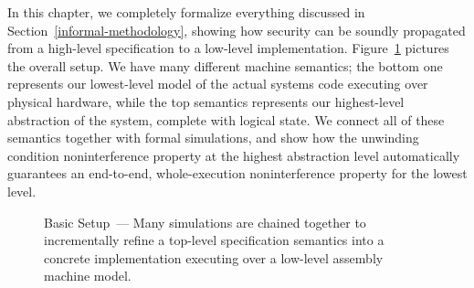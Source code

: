 \label{methodology-chapter}

In this chapter, we completely formalize everything
discussed in Section~\ref{informal-methodology}, showing
how security can be soundly propagated from a high-level 
specification to a low-level implementation. Figure~\ref{simulations}
pictures the overall setup. We have many different machine
semantics; the bottom one represents our lowest-level model of 
the actual systems code executing over physical hardware,
while the top semantics represents our highest-level abstraction
of the system, complete with logical state. We connect all
of these semantics together with formal simulations, and
show how the unwinding condition noninterference property
at the highest abstraction level automatically guarantees
an end-to-end, whole-execution noninterference property for
the lowest level.

\begin{figure}
\caption{\small{Basic Setup~--- Many simulations are chained together to 
incrementally refine a top-level specification semantics into a
concrete implementation executing over a low-level assembly machine
model.}}
\label{simulations}
\end{figure}

